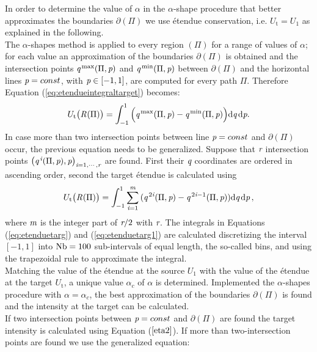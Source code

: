 In order to determine the value of $\alpha$ in the $\alpha$-shape procedure that better approximates the boundaries $\partial$$(\Pi)$ we use \'{e}tendue conservation, i.e. $U_{\textrm{t}}= U_1$ as explained in the following.\\ \indent
The $\alpha$-shapes method is applied to every region $(\Pi)$ for a range of values of $\alpha$;
   for each value an approximation of the boundaries $\partial$$(\Pi)$ is obtained and
   the intersection points $\textit{q}^{\textrm{\,max}}(\Pi,\textit{p})$ and $\textit{q}^{\textrm{\,min}}(\Pi,\textit{p})$ between $\partial$$(\Pi)$
and the horizontal lines $\textit{p}=const$, with $\textit{p}\in[-1,1]$, are computed for every path $\Pi$.
Therefore Equation (\ref{eq:etendueintegraltarget}) becomes:
\begin{equation}\label{eq:etenduetarg}
 U_\textrm{t}\big(\mbox{$\emph{R}_{\textit{}}$}(\Pi)\big)= \int_{-1}^{1}{\Big(\textit{q}^{\textrm{\,max}}(\Pi,\textit{p})-\textit{q}^{\textrm{\,min}}(\Pi,\textit{p})\Big)} \textrm{d}\textit{q}\,\textrm{d}\textit{p}.
\end{equation} In case more than two intersection points between line $\textit{p}=const$ and $\partial$$(\Pi)$ occur, the previous equation needs to be generalized. Suppose that $\textit{r}$ intersection points $\big(\textit{q}^{\,\textit{i}}(\Pi,\textit{p}), \textit{p}\big)_{\textit{i} = 1, \cdots, \textit{r}}$ are found. 
First their $\textit{q}$ coordinates are ordered in ascending order, second the target \'{e}tendue is calculated using
\begin{equation}\label{eq:etenduetarg1}
 U_\textrm{t}\big(\mbox{$\emph{R}_{\textit{}}$}(\Pi)\big) = \int_{-1}^{1}\sum_{\textit{i} = 1}^{\textit{m}}
{(\textit{q}^{\,2\textit{i}}(\Pi,\textit{p})}-{\textit{q}^{\,2\textit{i}-1} (\Pi, \textit{p}) )} \textrm{d}\textit{q}\,\textrm{d}\textit{p}\,,
\end{equation}
where $\textit{m}$ is the integer part of $\textit{r}/2$ with $\textit{r}$. 
The integrals in Equations (\ref{eq:etenduetarg}) and (\ref{eq:etenduetarg1}) are calculated discretizing the interval $[-1, 1]$
   into $\textrm{Nb}=100$ sub-intervals of equal length, the so-called bins, and using the trapezoidal rule to approximate the integral.
\\ \indent Matching the value of the \'{e}tendue at the source $U_1$ with the value of the \'{e}tendue at the target $U_{\textrm{t}}$, a unique value $\alpha_{c}$ of $\alpha$  is determined. Implemented the $\alpha$-shapes procedure with $\alpha = \alpha_c$, the best approximation of the boundaries $\partial$$(\Pi)$ is found and the intensity at the target can be calculated.\\ \indent If two intersection points between $\textit{p}=const$ and $\partial$$(\Pi)$ are found the target intensity is calculated using Equation ($\ref{eta2}$). If more than two-intersection points are found we use the generalized equation:

